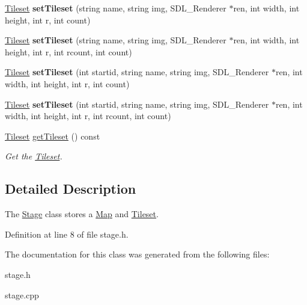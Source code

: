 \begin{DoxyCompactItemize}
\mbox{\label{classStage_ab62ad01c46da0337c294c4790020306f}} 
\hyperlink{classTileset}{Tileset} {\bfseries set\+Tileset} (string name, string img, S\+D\+L\+\_\+\+Renderer $\ast$ren, int width, int height, int r, int count)
\item 
\mbox{\label{classStage_a6e71c30197676d98a4a5694ad8b5a733}} 
\hyperlink{classTileset}{Tileset} {\bfseries set\+Tileset} (string name, string img, S\+D\+L\+\_\+\+Renderer $\ast$ren, int width, int height, int r, int rcount, int count)
\item 
\mbox{\label{classStage_ab90d4d0315e6991f2ed8216b6c804339}} 
\hyperlink{classTileset}{Tileset} {\bfseries set\+Tileset} (int startid, string name, string img, S\+D\+L\+\_\+\+Renderer $\ast$ren, int width, int height, int r, int count)
\item 
\mbox{\label{classStage_a42ee2fbdb79971f90984f603fcad54d6}} 
\hyperlink{classTileset}{Tileset} {\bfseries set\+Tileset} (int startid, string name, string img, S\+D\+L\+\_\+\+Renderer $\ast$ren, int width, int height, int r, int rcount, int count)
\item 
\mbox{\label{classStage_ab4df60dd0fa777ec19ff13056a17842a}} 
\hyperlink{classTileset}{Tileset} \hyperlink{classStage_ab4df60dd0fa777ec19ff13056a17842a}{get\+Tileset} () const
\begin{DoxyCompactList}\small\item\em Get the \hyperlink{classTileset}{Tileset}. \end{DoxyCompactList}\end{DoxyCompactItemize}


\subsection{Detailed Description}
The \hyperlink{classStage}{Stage} class stores a \hyperlink{classMap}{Map} and \hyperlink{classTileset}{Tileset}. 

Definition at line 8 of file stage.\+h.



The documentation for this class was generated from the following files\+:\begin{DoxyCompactItemize}
\item 
stage.\+h\item 
stage.\+cpp\end{DoxyCompactItemize}
